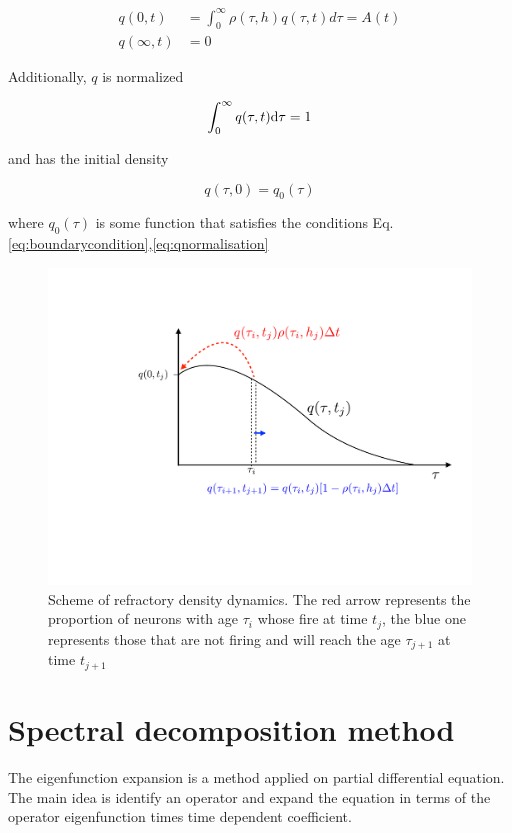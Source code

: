 \documentclass[a4paper,11pt,twoside]{article}
\def \dd  {{\rm d}}
\numberwithin{equation}{section}
\begin{document}
\begin{align}
\label{eq:boundarycondition}
q(0,t)&=\int_{0}^{\infty}\rho(\tau,h)q(\tau,t)d\tau=A(t) \\
q(\infty,t)&=0
\end{align}

Additionally, $q$ is normalized

\begin{equation}
\label{eq:qnormalisation}
\int_0^\infty q(\tau,t)\dd \tau = 1
\end{equation}

and has the initial density

\begin{equation}
\label{eq:qinitial}
q(\tau,0)=q_0(\tau)
\end{equation}

where $q_0(\tau)$ is some function that satisfies the conditions Eq.\eqref{eq:boundarycondition},\eqref{eq:qnormalisation}




\begin{figure}[h!]
	\centering
	\includegraphics[width=0.7\linewidth]{qtau.pdf}
	\caption{Scheme of refractory density dynamics. The red arrow represents the proportion of neurons with age $\tau_i$ whose fire at time $t_j$, the blue one represents those that are not firing and will reach the age $\tau_{j+1}$ at time $t_{j+1}$
	}
	\label{fig:qtau}
\end{figure}



\section{Spectral decomposition method}

The  eigenfunction expansion is a method applied on partial differential equation. The main idea is identify an operator and expand the equation in terms of the operator eigenfunction times time dependent coefficient. 
\end{document}
